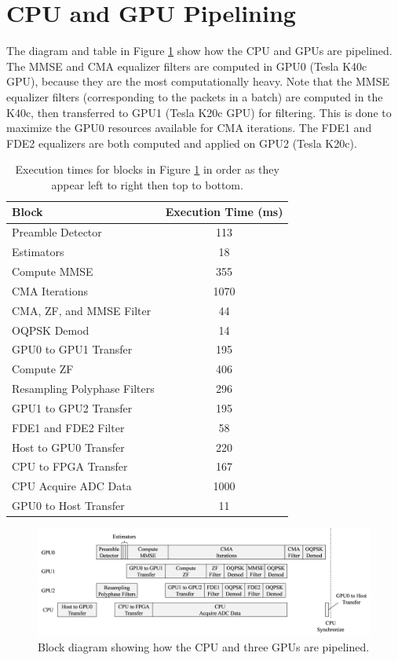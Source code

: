 \section{CPU and GPU Pipelining}
The diagram and table in Figure \ref{fig:GPUpipeLines} show how the CPU and GPUs are pipelined.
The MMSE and CMA equalizer filters are computed in GPU0 (Tesla K40c GPU), because they are the most computationally heavy.
Note that the MMSE equalizer filters (corresponding to the packets in a batch) are computed in the K40c, then transferred to GPU1 (Tesla K20c GPU) for filtering.
This is done to maximize the GPU0 resources available for CMA iterations.
The FDE1 and FDE2 equalizers are both computed and applied on GPU2 (Tesla K20c).
\begin{table}
\caption{Execution times for blocks in Figure \ref{fig:GPUpipeLines} in order as they appear left to right then top to bottom.}
\begin{center}
\begin{tabular}{lc}
	\toprule
	Block 					& Execution Time (ms)	\\ \midrule
	Preamble Detector 		& \hphantom{1}113	\\
	Estimators		 		& \hphantom{10}18	\\
	Compute MMSE			& \hphantom{0}355	\\
	CMA Iterations 			& 			  1070		\\
	CMA, ZF, and MMSE Filter& \hphantom{10}44		\\
	OQPSK Demod				& \hphantom{10}14		\\
	GPU0 to GPU1 Transfer	& \hphantom{1}195		\\
	Compute ZF				& \hphantom{1}406	\\
	Resampling Polyphase Filters & \hphantom{1}296	\\
	GPU1 to GPU2 Transfer	& \hphantom{1}195	\\
	FDE1 and FDE2 Filter	& \hphantom{10}58	\\
	Host to GPU0 Transfer	& \hphantom{1}220		\\
	CPU to FPGA Transfer	& \hphantom{1}167	\\
	CPU Acquire ADC Data	&  			   1000		\\
	GPU0 to Host Transfer	& \hphantom{10}11		\\
	\bottomrule
\end{tabular}
\end{center}
\label{tab:pipelineExecutionTimes}
\end{table}
\begin{figure}
\centering\includegraphics[width=15.33in/100*55]{figures/eq_equations/GPUpipeLines.pdf}
	\caption{Block diagram showing how the CPU and three GPUs are pipelined.}
	\label{fig:GPUpipeLines}
\end{figure}


